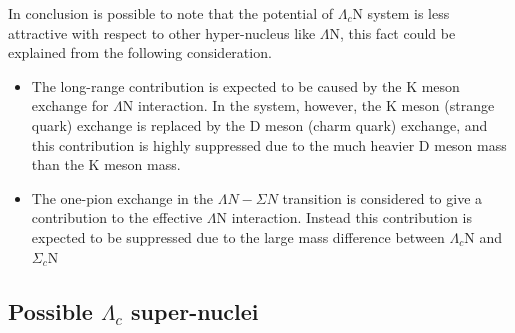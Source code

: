 \documentclass[12pt,a4paper]{book}
\begin{document}
	In conclusion is possible to note that the potential of $\Lambda_c$N system is less attractive with respect to other hyper-nucleus like $\Lambda$N, this fact could be explained from the following consideration. 
	\begin{itemize}
		\item The long-range contribution is expected to be caused by the K meson exchange for $\Lambda$N interaction. In the system, however, the K meson (strange quark) exchange is replaced by the D meson (charm quark) exchange, and this contribution is highly suppressed due to the much heavier D meson mass than the K meson mass. 
		\item The one-pion exchange in the $\Lambda N - \Sigma N$ transition is considered to give a contribution to the effective $\Lambda$N interaction. Instead this contribution is expected to be suppressed due to the large mass difference between $\Lambda_c$N and $\Sigma_c$N 
		
	\end{itemize}  
	
	\subsection{Possible $\Lambda_c$ super-nuclei}
	
\end{document}
